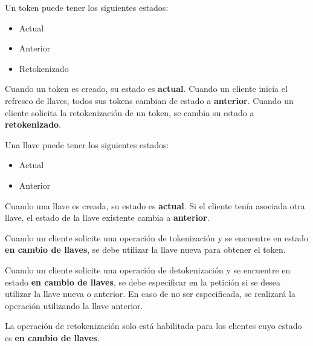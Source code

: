 {
  Un token puede tener los siguientes estados:
  \begin{itemize}
    \item Actual
    \item Anterior
    \item Retokenizado
  \end{itemize}

  \begin{hangparas}{2em}{0}
    Cuando un token es creado, su estado es \textbf{actual}.
    Cuando un cliente inicia el refresco de llaves, todos sus tokens cambian de
    estado a \textbf{anterior}.
    Cuando un cliente solicita la retokenización de un token, se cambia su estado
    a \textbf{retokenizado}.
  \end{hangparas}
}

{
  Una llave puede tener los siguientes estados:
  \begin{itemize}
    \item Actual
    \item Anterior
  \end{itemize}

  \begin{hangparas}{2em}{0}
    Cuando una llave es creada, su estado es \textbf{actual}. Si el cliente
    tenía asociada otra llave, el estado de la llave existente cambia a
    \textbf{anterior}.
  \end{hangparas}
}

{
  Cuando un cliente solicite una operación de tokenización y se encuentre en
  estado \textbf{en cambio de llaves}, se debe utilizar la llave nueva para
  obtener el token.
}

{
  Cuando un cliente solicite una operación de detokenización y se encuentre en
  estado \textbf{en cambio de llaves}, se debe especificar en la petición si
  se desea utilizar la llave nueva o anterior. En caso de no ser especificada,
  se realizará la operación utilizando la llave anterior.
}

{
  La operación de retokenización solo está habilitada para los clientes cuyo
  estado es \textbf{en cambio de llaves}.

}

